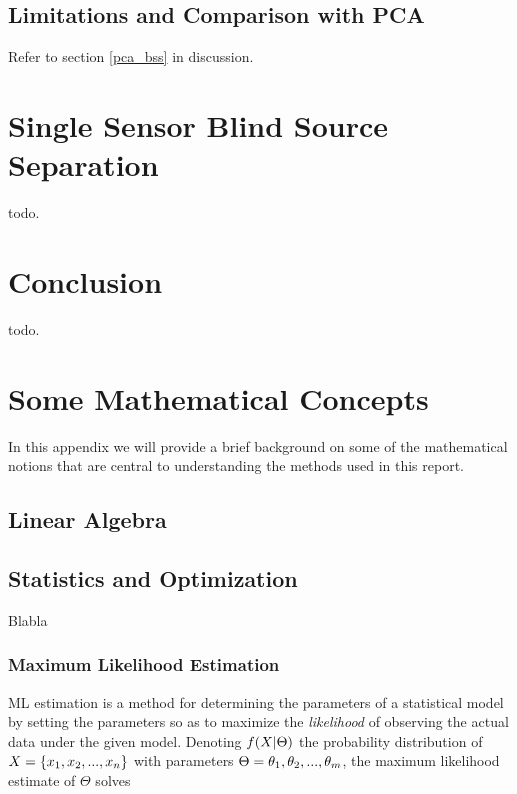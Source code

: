 \documentclass[11pt, oneside, a4paper]{report}
\begin{document}
\section{Limitations and Comparison with PCA}\label{ica_conclusions}

Refer to section \ref{pca_bss} in discussion.


\chapter{Single Sensor Blind Source Separation}\label{ssbss_chap}

todo.

\chapter{Conclusion}

todo.


\appendix
\chapter{Some Mathematical Concepts}

In this appendix we will provide a brief background on some of the mathematical notions that are central to understanding the methods used in this report. 

\section{Linear Algebra}



\section{Statistics and Optimization}

Blabla

\subsection{Maximum Likelihood Estimation}\label{ml-estimation}

ML estimation is a method for determining the parameters of a statistical model by setting the parameters so as to maximize the \emph{likelihood} of observing the actual data under the given model. Denoting $f(\boldmath{X}|\boldmath{\Theta})$ the probability distribution of $\boldmath{X} = \{x_1,x_2,...,x_n\}$ with parameters $\boldmath{\Theta} = {\theta_1, \theta_2, ..., \theta_m}$, the maximum likelihood estimate of $\Theta$ solves
\end{document}
